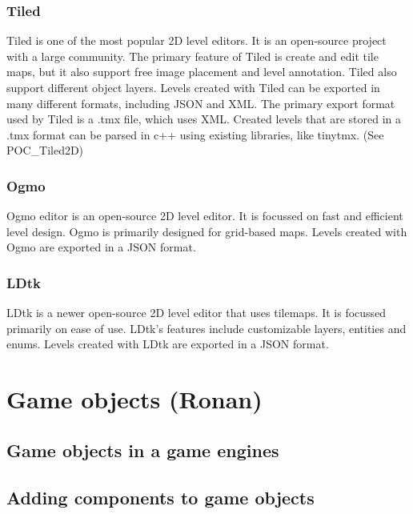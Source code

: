 \documentclass{article} %
\begin{document}
\subsubsection {Tiled}
Tiled is one of the most popular 2D level editors.
It is an open-source project with a large community.
The primary feature of Tiled is create and edit tile maps, but it also support free image placement
and level annotation. Tiled also support different object layers.
Levels created with Tiled can be exported in many different formats, including JSON and XML. The primary export format used by Tiled is a .tmx file, which uses XML.
Created levels that are stored in a .tmx format can be parsed in c++ using existing libraries, like tinytmx. (See POC\_Tiled2D)

\subsubsection {Ogmo}
Ogmo editor is an open-source 2D level editor.
It is focussed on fast and efficient level design.
Ogmo is primarily designed for grid-based maps.
Levels created with Ogmo are exported in a JSON format.

\subsubsection {LDtk}
LDtk is a newer open-source 2D level editor that uses tilemaps.
It is focussed primarily on ease of use.
LDtk's features include customizable layers, entities and enums.
Levels created with LDtk are exported in a JSON format.


\section{Game objects (Ronan)}
\subsection{Game objects in a game engines}
\subsection{Adding components to game objects}

\newpage
\end{document}

